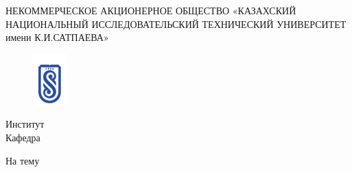 \thispagestyle{empty}
\begin{center}
	{\footnotesize НЕКОММЕРЧЕСКОЕ АКЦИОНЕРНОЕ ОБЩЕСТВО «КАЗАХСКИЙ НАЦИОНАЛЬНЫЙ ИССЛЕДОВАТЕЛЬСКИЙ ТЕХНИЧЕСКИЙ УНИВЕРСИТЕТ имени К.И.САТПАЕВА» }
\end{center}

\begin{figure}[ht]
	\centering
	\includegraphics[width=0.08\linewidth]{images/satlogo}
	\label{fig:satlogo}
\end{figure}

\begin{center}
	{\fontsize{12pt}{0}\selectfont Институт \institute \\
	Кафедра	\kafedra}
\end{center}

\vspace{2em}

\begin{center}
	{\LARGE \textbf{\tipraboty}}
\end{center}
\vspace{0.25em}
\begin{center}
	На тему \thetitle
\end{center}

